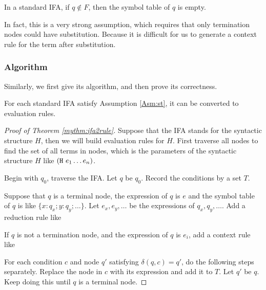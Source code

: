 \begin{Asm}
\label{Asm:st} 
In a standard IFA, if $q \notin F$, then the symbol table of $q$ is empty.
\end{Asm}

In fact, this is a very strong assumption, which requires that only termination nodes could have substitution. Because it is difficult for us to generate a context rule for the term after substitution. 

\subsubsection{Algorithm}

Similarly, we first give its algorithm, and then prove its correctness.

\begin{mythm}
\label{mythm:ifa2rule}
For each standard IFA satisfy Assumption \ref{Asm:st}, it can be converted to evaluation rules.
\end{mythm}

\begin{proof}[Proof of Theorem \ref{mythm:ifa2rule}]

Suppose that the IFA stands for the syntactic structure $H$, then we will build evaluation rules for $H$. First traverse all nodes to find the set of all terms in nodes, which is the parameters of the syntactic structure $H$ like $(\mbox{\tt H}~e_1 \ldots e_n)$. 

Begin with $q_0$, traverse the IFA. Let $q$ be $q_0$. Record the conditions by a set $T$.

Suppose that $q$ is a terminal node, the expression of $q$ is $e$ and the symbol table of $q$ is like $\{x:q_x; y:q_y; \ldots\}$. Let $e_x,e_y,\ldots$ be the expressions of $q_x, q_y, \ldots$. Add a reduction rule like


If $q$ is not a termination node, and the expression of $q$ is $e_i$, add a context rule like


For each condition $c$ and node $q'$ satisfying $\delta(q, c)=q'$, do the following steps separately. Replace the node in $c$ with its expression and add it to $T$. Let $q'$ be $q$. Keep doing this until $q$ is a terminal node.

\end{proof}

